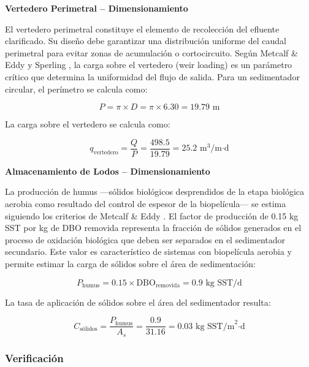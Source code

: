 \documentclass[12pt,a4paper]{article}
\begin{document}
\textbf{Vertedero Perimetral -- Dimensionamiento}

El vertedero perimetral constituye el elemento de recolección del efluente clarificado. Su diseño debe garantizar una distribución uniforme del caudal perimetral para evitar zonas de acumulación o cortocircuito. Según Metcalf \& Eddy \cite{metcalf2014} y Sperling \cite{sperling2007}, la carga sobre el vertedero (weir loading) es un parámetro crítico que determina la uniformidad del flujo de salida. Para un sedimentador circular, el perímetro se calcula como:

\begin{equation}
P = \pi \times D = \pi \times 6.30 = 19.79 \text{ m}
\end{equation}

La carga sobre el vertedero se calcula como:

\begin{equation}
q_{\text{vertedero}} = \frac{Q}{P} = \frac{498.5}{19.79} = 25.2 \text{ m}^3\text{/m·d}
\end{equation}

\textbf{Almacenamiento de Lodos -- Dimensionamiento}

La producción de humus —sólidos biológicos desprendidos de la etapa biológica aerobia como resultado del control de espesor de la biopelícula— se estima siguiendo los criterios de Metcalf \& Eddy \cite{metcalf2014}. El factor de producción de 0.15 kg SST por kg de DBO removida representa la fracción de sólidos generados en el proceso de oxidación biológica que deben ser separados en el sedimentador secundario. Este valor es característico de sistemas con biopelícula aerobia y permite estimar la carga de sólidos sobre el área de sedimentación:

\begin{equation}
P_{\text{humus}} = 0.15 \times \text{DBO}_{\text{removida}} = 0.9 \text{ kg SST/d}
\end{equation}

La tasa de aplicación de sólidos sobre el área del sedimentador resulta:

\begin{equation}
C_{\text{sólidos}} = \frac{P_{\text{humus}}}{A_s} = \frac{0.9}{31.16} = 0.03 \text{ kg SST/m}^2\text{·d}
\end{equation}

\subsubsection{Verificación}
\end{document}
